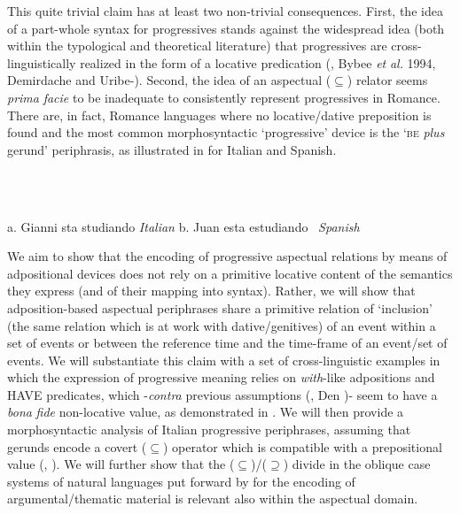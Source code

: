 \documentclass[output=paper]{langsci/langscibook}
\begin{document}
This quite trivial claim has at least two non-trivial consequences. First, the idea of a part-whole syntax for progressives stands against the widespread idea (both within the typological and theoretical literature) that progressives are cross-linguistically realized in the form of a locative predication (\citealt{MateuAmadas1999}, Bybee \textit{et} \textit{al.} 1994, Demirdache and Uribe-\citealt{Etxebarria1997}).  Second, the idea of an aspectual (${\subseteq}$) relator seems \textit{prima} \textit{facie} to be inadequate to consistently represent progressives in Romance. There are, in fact, Romance languages where no locative/dative preposition is found and the most common morphosyntactic ‘progressive’ device is the ‘\textsc{be} \textit{plus} gerund’ periphrasis, as illustrated in  for Italian and Spanish.

\ea%
    \label{ex:key:9}
    \gll\\
        \\
    \glt
    \z

           a.  Gianni sta studiando         \textit{Italian}      b.   Juan esta estudiando~      \textit{Spanish}

We aim to show that the encoding of progressive aspectual relations by means of adpositional devices does not rely on a primitive locative content of the semantics they express (and of their mapping into syntax). Rather, we will show that adposition-based aspectual periphrases share a primitive relation of ‘inclusion’ (the same relation which is at work with dative/genitives) of an event within a set of events or between the reference time and the time-frame of an event/set of events. We will substantiate this claim with a set of cross-linguistic examples in which the expression of progressive meaning relies on \textit{with}{}-like adpositions and HAVE predicates, which -\textit{contra} previous assumptions (\citealt{Freeze1992}, Den \citealt{Dikken1998})- seem to have a \textit{bona} \textit{fide} non-locative value, as demonstrated in \citet{Levinson2011}. We will then provide a morphosyntactic analysis of Italian progressive periphrases, assuming that gerunds encode a covert (${\subseteq}$) operator which is compatible with  a prepositional value (\citealt{Gallego2010}, \citealt{Franco2015}). We will further show that the (${\subseteq}$)/(${\supseteq}$) divide in the oblique case systems of natural languages put forward by \citet{FrancoManzini2017b} for the encoding of argumental/thematic material is relevant also within the aspectual domain.
\end{document}
